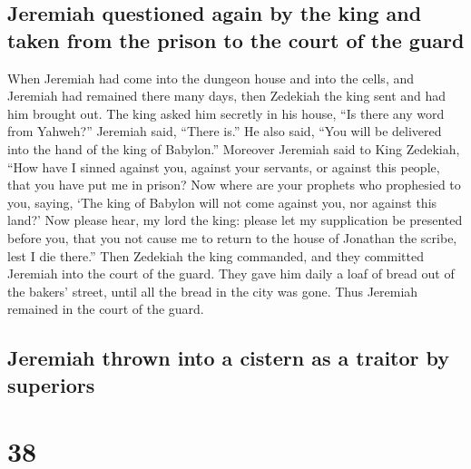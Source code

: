 \hypertarget{jeremiah-questioned-again-by-the-king-and-taken-from-the-prison-to-the-court-of-the-guard}{%
\subsection{Jeremiah questioned again by the king and taken from the
prison to the court of the
guard}\label{jeremiah-questioned-again-by-the-king-and-taken-from-the-prison-to-the-court-of-the-guard}}

 When Jeremiah had come into the dungeon house and into
the cells, and Jeremiah had remained there many days, 
then Zedekiah the king sent and had him brought out. The king asked him
secretly in his house, ``Is there any word from Yahweh?'' Jeremiah said,
``There is.'' He also said, ``You will be delivered into the hand of the
king of Babylon.''  Moreover Jeremiah said to King
Zedekiah, ``How have I sinned against you, against your servants, or
against this people, that you have put me in prison?  Now
where are your prophets who prophesied to you, saying, `The king of
Babylon will not come against you, nor against this land?'
 Now please hear, my lord the king: please let my
supplication be presented before you, that you not cause me to return to
the house of Jonathan the scribe, lest I die there.'' 
Then Zedekiah the king commanded, and they committed Jeremiah into the
court of the guard. They gave him daily a loaf of bread out of the
bakers' street, until all the bread in the city was gone. Thus Jeremiah
remained in the court of the guard.

\hypertarget{jeremiah-thrown-into-a-cistern-as-a-traitor-by-superiors}{%
\subsection{Jeremiah thrown into a cistern as a traitor by
superiors}\label{jeremiah-thrown-into-a-cistern-as-a-traitor-by-superiors}}

\hypertarget{section-37}{%
\section{38}\label{section-37}}

